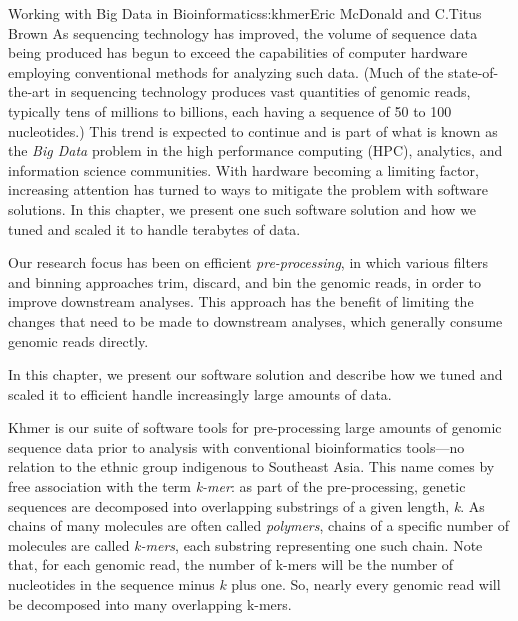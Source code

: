 \begin{aosachapter}{Working with Big Data in Bioinformatics}{s:khmer}{Eric McDonald and C.\/Titus Brown}
As sequencing technology has improved, the volume of sequence data being
produced has begun to exceed the capabilities of computer hardware
employing conventional methods for analyzing such data. (Much of the
state-of-the-art in sequencing technology produces vast quantities of
genomic reads, typically tens of millions to billions, each having a
sequence of 50 to 100 nucleotides.) This trend is expected to continue
and is part of what is known as the \emph{Big Data} \cite{web:bigdata}
problem in the high performance computing (HPC), analytics, and
information science communities. With hardware becoming a limiting
factor, increasing attention has turned to ways to mitigate the problem
with software solutions. In this chapter, we present one such software
solution and how we tuned and scaled it to handle terabytes of data.

Our research focus has been on efficient \emph{pre-processing}, in which
various filters and binning approaches trim, discard, and bin the
genomic reads, in order to improve downstream analyses. This approach
has the benefit of limiting the changes that need to be made to
downstream analyses, which generally consume genomic reads directly.

In this chapter, we present our software solution and describe how we
tuned and scaled it to efficient handle increasingly large amounts of
data.


Khmer is our suite of software tools for pre-processing large amounts of
genomic sequence data prior to analysis with conventional bioinformatics
tools\cite{web:khmer}---no relation to the ethnic group indigenous to
Southeast Asia. This name comes by free association with the term
\emph{k-mer}: as part of the pre-processing, genetic sequences are
decomposed into overlapping substrings of a given length, \emph{k}. As
chains of many molecules are often called \emph{polymers}, chains of a
specific number of molecules are called \emph{k-mers}, each substring
representing one such chain. Note that, for each genomic read, the
number of k-mers will be the number of nucleotides in the sequence minus
$k$ plus one. So, nearly every genomic read will be decomposed into many
overlapping k-mers.



\end{aosachapter}
